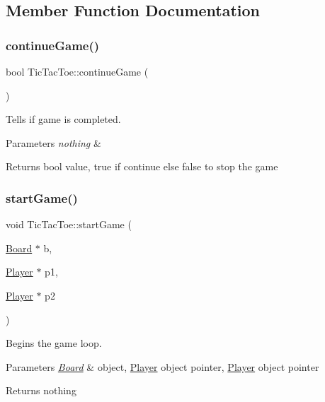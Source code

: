 \subsection{Member Function Documentation}
\mbox{\label{classTicTacToe_a866e38e3280ef65ae6f43473cc4e0532}} 
\subsubsection{\texorpdfstring{continue\+Game()}{continueGame()}}
{\footnotesize\ttfamily bool Tic\+Tac\+Toe\+::continue\+Game (\begin{DoxyParamCaption}{ }\end{DoxyParamCaption})}



Tells if game is completed. 


\begin{DoxyParams}{Parameters}
{\em nothing} & \\
\hline
\end{DoxyParams}
\begin{DoxyReturn}{Returns}
bool value, true if continue else false to stop the game 
\end{DoxyReturn}
\mbox{\label{classTicTacToe_afe9570245c1c941777a7bd367ee10e61}} 
\subsubsection{\texorpdfstring{start\+Game()}{startGame()}}
{\footnotesize\ttfamily void Tic\+Tac\+Toe\+::start\+Game (\begin{DoxyParamCaption}\item[{\mbox{\hyperlink{classBoard}{Board}} $\ast$}]{b,  }\item[{\mbox{\hyperlink{classPlayer}{Player}} $\ast$}]{p1,  }\item[{\mbox{\hyperlink{classPlayer}{Player}} $\ast$}]{p2 }\end{DoxyParamCaption})}



Begins the game loop. 


\begin{DoxyParams}{Parameters}
{\em \mbox{\hyperlink{classBoard}{Board}}} & object, \mbox{\hyperlink{classPlayer}{Player}} object pointer, \mbox{\hyperlink{classPlayer}{Player}} object pointer \\
\hline
\end{DoxyParams}
\begin{DoxyReturn}{Returns}
nothing 
\end{DoxyReturn}


